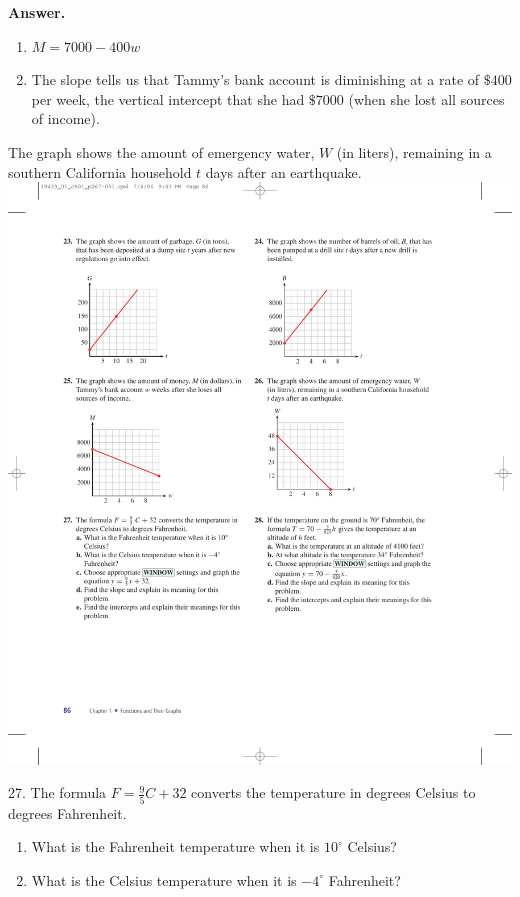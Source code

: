 \documentclass[10pt,]{book}
\theoremstyle{plain}
\theoremstyle{definition}
\theoremstyle{definition}
\theoremstyle{definition}
\theoremstyle{definition}
\numberwithin{equation}{part}
\newcommand\degree[0]{^{\circ}}
\begin{document}
\begin{exerciselist}
\begin{exercisegroup}
%
\par\smallskip
\noindent\textbf{Answer.}\hypertarget{answer-176}{}\quad
\leavevmode%
\begin{enumerate}[label=*\alph**]
\item\hypertarget{li-1174}{}\(M = 7000 - 400w\)%
\item\hypertarget{li-1175}{}The slope tells us that Tammy's bank account is diminishing at a rate of \(\$400\) per week, the vertical intercept that she had \(\$7000\) (when she lost all sources of income).%
\end{enumerate}
%
\exercise[26.]\hypertarget{exercise-312}{}The graph shows the amount of emergency water, \(W\) (in liters), remaining in a southern California household \(t\) days after an earthquake. \includegraphics[width=0.8\linewidth]{images/fig-ex-1-5-26}
%
\end{exercisegroup}
\par\smallskip\noindent
\item[27.]\hypertarget{exercise-313}{}The formula \(F = \frac{9}{5}C + 32\) converts the temperature in degrees Celsius to degrees Fahrenheit. \leavevmode%
\begin{enumerate}[label=*\alph**]
\item\hypertarget{li-1176}{}What is the Fahrenheit temperature when it is \(10\degree\) Celsius?%
\item\hypertarget{li-1177}{}What is the Celsius temperature when it is \(-4\degree\) Fahrenheit?%

\end{enumerate}
\end{exerciselist}
\end{document}
